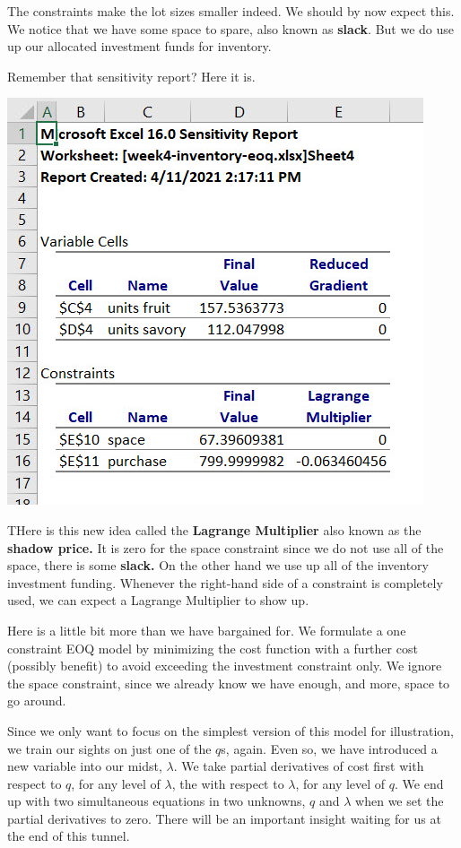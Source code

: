 \documentclass[
]{book}
\begin{document}
The constraints make the lot sizes smaller indeed. We should by now expect this. We notice that we have some space to spare, also known as \textbf{slack}. But we do use up our allocated investment funds for inventory.

Remember that sensitivity report? Here it is.

\includegraphics{images/04/eoq-space-investment-lagrange-multiplier.jpg}

THere is this new idea called the \textbf{Lagrange Multiplier} also known as the \textbf{shadow price.} It is zero for the space constraint since we do not use all of the space, there is some \textbf{slack.} On the other hand we use up all of the inventory investment funding. Whenever the right-hand side of a constraint is completely used, we can expect a Lagrange Multiplier to show up.

Here is a little bit more than we have bargained for. We formulate a one constraint EOQ model by minimizing the cost function with a further cost (possibly benefit) to avoid exceeding the investment constraint only. We ignore the space constraint, since we already know we have enough, and more, space to go around.

Since we only want to focus on the simplest version of this model for illustration, we train our sights on just one of the \(q\)s, again. Even so, we have introduced a new variable into our midst, \(\lambda\). We take partial derivatives of cost first with respect to \(q\), for any level of \(\lambda\), the with respect to \(\lambda\), for any level of \(q\). We end up with two simultaneous equations in two unknowns, \(q\) and \(\lambda\) when we set the partial derivatives to zero. There will be an important insight waiting for us at the end of this tunnel.
\end{document}
